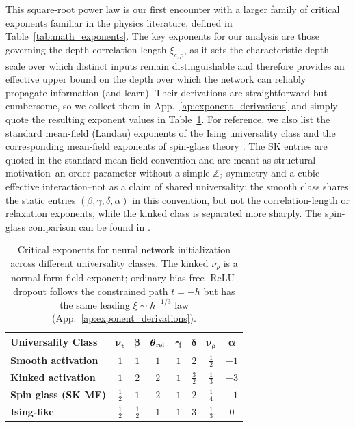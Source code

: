 \documentclass{article}
\DeclareMathOperator{\ReLU}{ReLU}
\newcommand{\relu}{\ensuremath{\ReLU}}
\theoremstyle{plain}
\theoremstyle{definition}
\theoremstyle{remark}
\begin{document}
This square-root power law is our first encounter with a larger family of critical exponents familiar in the physics literature, defined in Table~\ref{tab:math_exponents}. The key exponents for our analysis are those governing the depth correlation length $\xi_{c,\rho}$, as it sets the characteristic depth scale over which distinct inputs remain distinguishable and therefore provides an effective upper bound on the depth over which the network can reliably propagate information (and learn). Their derivations are straightforward but cumbersome, so we collect them in App.~\ref{ap:exponent_derivations} and simply quote the resulting exponent values in Table~\ref{tab:critical_exponents}. For reference, we also list the standard mean-field (Landau) exponents of the Ising universality class \cite{Ising1925,LandauLifshitzStatPhys} and the corresponding mean-field exponents of spin-glass theory \cite{EdwardsAnderson1975,Parisi1979PRL,Parisi1980JPA,Parisi1983PRL}. The SK entries are quoted in the standard mean-field convention and are meant as structural motivation--an order parameter without a simple \(\mathbb Z_2\) symmetry and a cubic effective interaction--not as a claim of shared universality: the smooth class shares the static entries \((\beta,\gamma,\delta,\alpha)\) in this convention, but not the correlation-length or relaxation exponents, while the kinked class is separated more sharply. The spin-glass comparison can be found in \cite{MezardParisiVirasoro1987,Parisi1983RMP,sherrington1975sk}.



\begin{table}[h]
\caption{Critical exponents for neural network initialization across different universality classes. The kinked \(\nu_\rho\) is a normal-form field exponent; ordinary bias-free \relu{} dropout follows the constrained path \(t=-h\) but has the same leading \(\xi\sim h^{-1/3}\) law (App.~\ref{ap:exponent_derivations}).}
\label{tab:critical_exponents}
\centering
\small
\setlength{\tabcolsep}{3pt}
\renewcommand{\arraystretch}{1.25}
\begin{tabular}{@{} l ccccccc @{}}
\toprule
\textbf{Universality Class} & $\boldsymbol{\nu_t}$ & $\boldsymbol{\beta}$ & $\boldsymbol{\theta}_{\rm rel}$ & $\boldsymbol{\gamma}$ & $\boldsymbol{\delta}$ & $\boldsymbol{\nu_\rho}$ & $\boldsymbol{\alpha}$ \\
\midrule
\textbf{Smooth activation} & $1$ & $1$ & $1$ & $1$ & $2$ & $\frac{1}{2}$ & $-1$ \\[6pt]
\textbf{Kinked activation} & $1$ & $2$ & $2$ & $1$ & $\frac{3}{2}$ & $\frac{1}{3}$ & $-3$ \\[6pt]
\textbf{Spin glass (SK MF)} & $\frac{1}{2}$ & $1$ & $2$ & $1$ & $2$ & $\frac{1}{4}$ & $-1$ \\[6pt]
\textbf{Ising-like} & $\frac{1}{2}$ & $\frac{1}{2}$ & $1$ & $1$ & $3$ & $\frac{1}{3}$ & $0$ \\
\bottomrule
\end{tabular}
\end{table}
\end{document}
